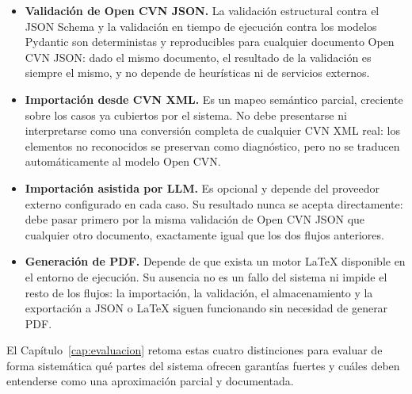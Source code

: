 \begin{itemize}
  \item \textbf{Validación de Open CVN JSON.} La validación estructural
  contra el JSON Schema y la validación en tiempo de ejecución contra los
  modelos Pydantic son deterministas y reproducibles para cualquier
  documento Open CVN JSON: dado el mismo documento, el resultado de la
  validación es siempre el mismo, y no depende de heurísticas ni de
  servicios externos.

  \item \textbf{Importación desde CVN XML.} Es un mapeo semántico parcial,
  creciente sobre los casos ya cubiertos por el sistema. No debe
  presentarse ni interpretarse como una conversión completa de cualquier CVN
  XML real: los elementos no reconocidos se preservan como diagnóstico, pero
  no se traducen automáticamente al modelo Open CVN.

  \item \textbf{Importación asistida por LLM.} Es opcional y depende del
  proveedor externo configurado en cada caso. Su resultado nunca se acepta
  directamente: debe pasar primero por la misma validación de Open CVN JSON
  que cualquier otro documento, exactamente igual que los dos flujos
  anteriores.

  \item \textbf{Generación de PDF.} Depende de que exista un motor LaTeX
  disponible en el entorno de ejecución. Su ausencia no es un fallo del
  sistema ni impide el resto de los flujos: la importación, la validación,
  el almacenamiento y la exportación a JSON o LaTeX siguen funcionando sin
  necesidad de generar PDF.
\end{itemize}

El Capítulo~\ref{cap:evaluacion} retoma estas cuatro distinciones para evaluar de forma
sistemática qué partes del sistema ofrecen garantías fuertes y cuáles deben
entenderse como una aproximación parcial y documentada.
